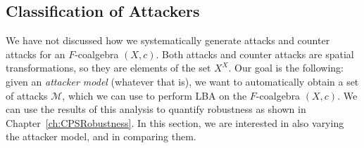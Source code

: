 \subsection{Classification of Attackers}
\label{sec:Latent:Classification}
We have not discussed how we systematically generate attacks and counter attacks for an $F$-coalgebra $(X,c)$. Both attacks and counter attacks are spatial transformations, so they are elements of the set $X^X$. %
Our goal is the following: given an \emph{attacker model} (whatever that is), we want to automatically obtain a set of attacks $\mathcal{M}$, which we can use to perform LBA on the $F$-coalgebra $(X,c)$. We can use the results of this analysis to quantify robustness as shown in Chapter~\ref{ch:CPSRobustness}. In this section, we are interested in also varying the attacker model, and in comparing them.

